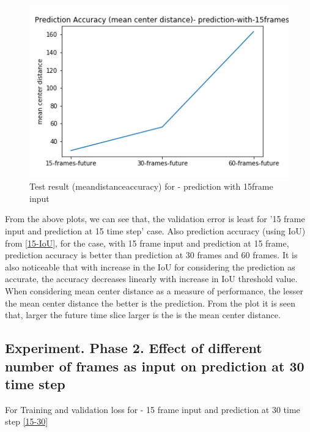 \begin{figure}[H] \label{15-mcd}
\includegraphics[scale=0.8]{prediction-with-15frames-mean_distance_accuracy}
\begin{center}
\caption{Test result (mean\textunderscore distance\textunderscore accuracy) for - prediction with 15frame input }
\end{center}
\end{figure}

From the above plots, we can see that, the validation error is least for '15 frame input and prediction at 15 time step' case. Also prediction accuracy (using IoU) from \ref{15-IoU}, for the case, with 15 frame input and prediction at 15 frame, prediction accuracy is better than prediction at 30 frames and 60 frames. It is also noticeable that with increase in the IoU for considering the prediction as accurate, the accuracy decreases linearly with increase in IoU threshold value. When considering mean center distance as a measure of performance, the lesser the mean center distance the better is the prediction. From the plot it is seen that, larger the future time slice larger is the is the mean center distance.

\subsection{Experiment. Phase 2. Effect of different number of frames as input on prediction at 30  time step}
For Training and validation loss for - 15 frame input and prediction at 30 time step \ref{15-30}

